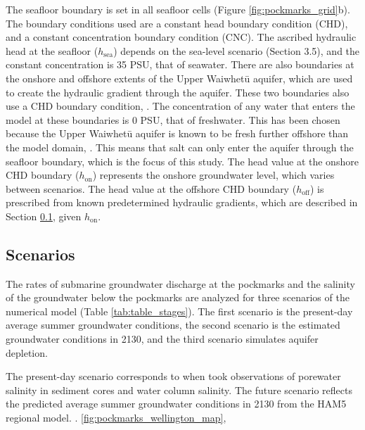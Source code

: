 \documentclass[draft, 10pt]{agujournal2019}
\begin{document}
The seafloor boundary is set in all seafloor cells (Figure \ref{fig:pockmarks_grid}b). The boundary conditions used are a constant head boundary condition (CHD), and a constant concentration boundary condition (CNC). The ascribed hydraulic head at the seafloor ($h_{\mathrm{sea}}$) depends on the sea-level scenario (Section 3.5), and the constant concentration is 35 PSU, that of seawater. There are also boundaries at the onshore and offshore extents of the Upper Waiwhetū aquifer, which are used to create the hydraulic gradient through the aquifer. These two boundaries also use a CHD boundary condition, . The concentration of any water that enters the model at these boundaries is 0 PSU, that of freshwater.  This has been chosen because the Upper Waiwhetū aquifer is known to be fresh further offshore than the model domain,  . This means that salt can only enter the aquifer through the seafloor boundary, which is the focus of this study. The head value at the onshore CHD boundary ($h_{\mathrm{on}}$) represents the onshore groundwater level, which varies between scenarios. The head value at the offshore CHD boundary ($h_{\mathrm{off}}$) is prescribed from known predetermined hydraulic gradients, which are described in Section \ref{scenarios}, given $h_{\mathrm{on}}$.

\subsection{Scenarios}\label{scenarios}
The rates of submarine groundwater discharge at the pockmarks and the salinity of the groundwater below the pockmarks are analyzed for three scenarios of the numerical model (Table \ref{tab:table_stages}). The first scenario is the present-day average summer groundwater conditions, the second scenario is the estimated groundwater conditions in 2130, and the third scenario simulates aquifer depletion. 

The present-day scenario corresponds to when  took observations of porewater salinity in sediment cores and water column salinity.
The future scenario reflects the predicted average summer groundwater conditions in 2130 from the HAM5 regional model.
 \cite{bennett_hutt_2024}.
 \ref{fig:pockmarks_wellington_map},
\end{document}
